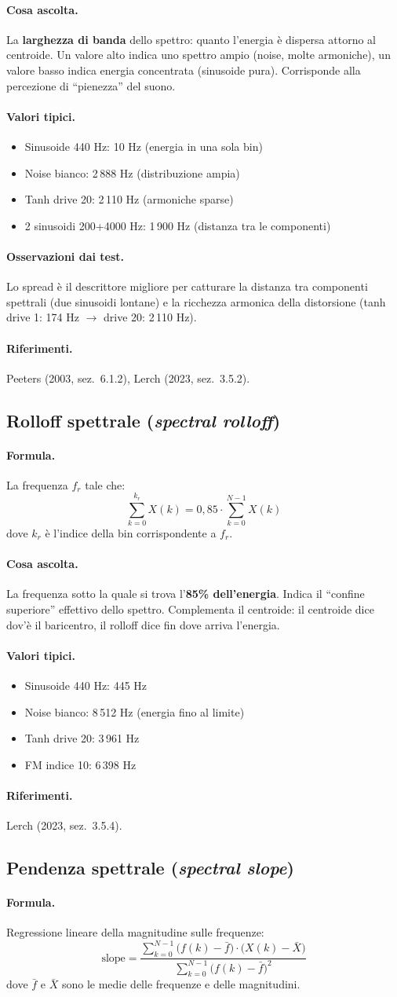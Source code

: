 \documentclass[a4paper,11pt]{article}
\newcommand{\desc}[1]{\subsection{#1}}
\newcommand{\formula}{\paragraph{Formula.}}
\newcommand{\ascolta}{\paragraph{Cosa ascolta.}}
\newcommand{\range}{\paragraph{Valori tipici.}}
\newcommand{\rif}{\paragraph{Riferimenti.}}
\newcommand{\oss}{\paragraph{Osservazioni dai test.}}
\begin{document}
\ascolta
La \textbf{larghezza di banda} dello spettro: quanto l'energia è
dispersa attorno al centroide. Un valore alto indica uno spettro ampio
(noise, molte armoniche), un valore basso indica energia concentrata
(sinusoide pura). Corrisponde alla percezione di ``pienezza'' del suono.

\range
\begin{itemize}[nosep]
  \item Sinusoide 440 Hz: 10 Hz (energia in una sola bin)
  \item Noise bianco: 2\,888 Hz (distribuzione ampia)
  \item Tanh drive 20: 2\,110 Hz (armoniche sparse)
  \item 2 sinusoidi 200+4000 Hz: 1\,900 Hz (distanza tra le componenti)
\end{itemize}

\oss Lo spread è il descrittore migliore per catturare la distanza
tra componenti spettrali (due sinusoidi lontane) e la ricchezza armonica
della distorsione (tanh drive 1: 174 Hz $\to$ drive 20: 2\,110 Hz).

\rif Peeters (2003, sez.~6.1.2), Lerch (2023, sez.~3.5.2).

\desc{Rolloff spettrale (\emph{spectral rolloff})}

\formula
La frequenza $f_r$ tale che:
\[
  \sum_{k=0}^{k_r} X(k) = 0{,}85 \cdot \sum_{k=0}^{N-1} X(k)
\]
dove $k_r$ è l'indice della bin corrispondente a $f_r$.

\ascolta
La frequenza sotto la quale si trova l'\textbf{85\% dell'energia}. Indica
il ``confine superiore'' effettivo dello spettro. Complementa il centroide:
il centroide dice dov'è il baricentro, il rolloff dice fin dove arriva
l'energia.

\range
\begin{itemize}[nosep]
  \item Sinusoide 440 Hz: 445 Hz
  \item Noise bianco: 8\,512 Hz (energia fino al limite)
  \item Tanh drive 20: 3\,961 Hz
  \item FM indice 10: 6\,398 Hz
\end{itemize}

\rif Lerch (2023, sez.~3.5.4).

\desc{Pendenza spettrale (\emph{spectral slope})}

\formula
Regressione lineare della magnitudine sulle frequenze:
\[
  \text{slope} = \frac{\displaystyle\sum_{k=0}^{N-1} \big(f(k) - \bar{f}\big) \cdot \big(X(k) - \bar{X}\big)}
                      {\displaystyle\sum_{k=0}^{N-1} \big(f(k) - \bar{f}\big)^2}
\]
dove $\bar{f}$ e $\bar{X}$ sono le medie delle frequenze e delle magnitudini.
\end{document}
